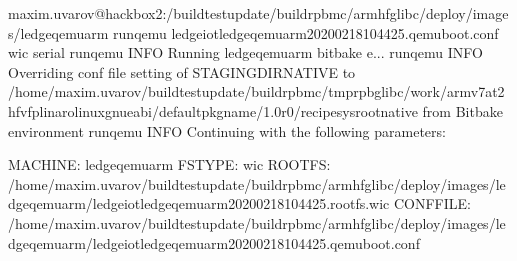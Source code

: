 \documentclass[a4paper,10pt,oneside,english]{sphinxmanual}
\begin{document}
\begin{sphinxVerbatim}[commandchars=\\\{\}]
maxim.uvarov@hackbox2:\PYGZti{}/build\PYGZhy{}test\PYGZhy{}update/build\PYGZhy{}rpb\PYGZhy{}mc/armhf\PYGZhy{}glibc/deploy/images/ledge\PYGZhy{}qemuarm\PYGZdl{} runqemu ledge\PYGZhy{}iot\PYGZhy{}ledge\PYGZhy{}qemuarm\PYGZhy{}20200218104425.qemuboot.conf wic serial
runqemu \PYGZhy{} INFO \PYGZhy{} Running ledge\PYGZhy{}qemuarm bitbake \PYGZhy{}e...
runqemu \PYGZhy{} INFO \PYGZhy{} Overriding conf file setting of STAGING\PYGZus{}DIR\PYGZus{}NATIVE to /home/maxim.uvarov/build\PYGZhy{}test\PYGZhy{}update/build\PYGZhy{}rpb\PYGZhy{}mc/tmp\PYGZhy{}rpb\PYGZhy{}glibc/work/armv7at2hf\PYGZhy{}vfp\PYGZhy{}linaro\PYGZhy{}linux\PYGZhy{}gnueabi/defaultpkgname/1.0\PYGZhy{}r0/recipe\PYGZhy{}sysroot\PYGZhy{}native from Bitbake environment
runqemu \PYGZhy{} INFO \PYGZhy{} Continuing with the following parameters:

MACHINE: \PYG{o}{[}ledge\PYGZhy{}qemuarm\PYG{o}{]}
FSTYPE: \PYG{o}{[}wic\PYG{o}{]}
ROOTFS: \PYG{o}{[}/home/maxim.uvarov/build\PYGZhy{}test\PYGZhy{}update/build\PYGZhy{}rpb\PYGZhy{}mc/armhf\PYGZhy{}glibc/deploy/images/ledge\PYGZhy{}qemuarm/ledge\PYGZhy{}iot\PYGZhy{}ledge\PYGZhy{}qemuarm\PYGZhy{}20200218104425.rootfs.wic\PYG{o}{]}
CONFFILE: \PYG{o}{[}/home/maxim.uvarov/build\PYGZhy{}test\PYGZhy{}update/build\PYGZhy{}rpb\PYGZhy{}mc/armhf\PYGZhy{}glibc/deploy/images/ledge\PYGZhy{}qemuarm/ledge\PYGZhy{}iot\PYGZhy{}ledge\PYGZhy{}qemuarm\PYGZhy{}20200218104425.qemuboot.conf\PYG{o}{]}


\end{sphinxVerbatim}
\end{document}
